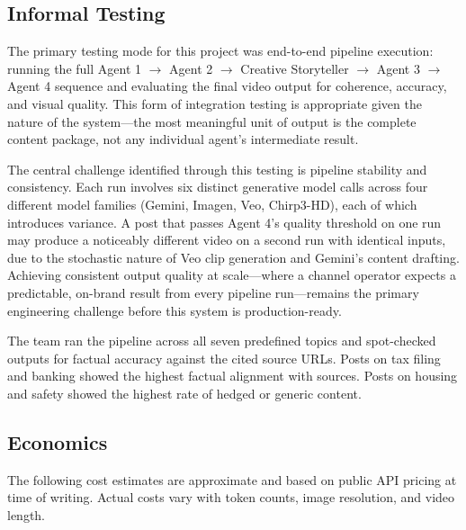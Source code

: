 \documentclass[12pt, letterpaper]{article}
\begin{document}
\subsection{Informal Testing}

The primary testing mode for this project was end-to-end pipeline execution: running the
full Agent 1 $\to$ Agent 2 $\to$ Creative Storyteller $\to$ Agent 3 $\to$ Agent 4 sequence
and evaluating the final video output for coherence, accuracy, and visual quality. This
form of integration testing is appropriate given the nature of the system---the most
meaningful unit of output is the complete content package, not any individual agent's
intermediate result.

The central challenge identified through this testing is pipeline stability and
consistency. Each run involves six distinct generative model calls across four different
model families (Gemini, Imagen, Veo, Chirp3-HD), each of which introduces variance.
A post that passes Agent 4's quality threshold on one run may produce a noticeably
different video on a second run with identical inputs, due to the stochastic nature of
Veo clip generation and Gemini's content drafting. Achieving consistent output quality
at scale---where a channel operator expects a predictable, on-brand result from every
pipeline run---remains the primary engineering challenge before this system is production-ready.

The team ran the pipeline across all seven predefined topics and spot-checked outputs
for factual accuracy against the cited source URLs. Posts on tax filing and banking
showed the highest factual alignment with sources. Posts on housing and safety showed
the highest rate of hedged or generic content.

\subsection{Economics}

The following cost estimates are approximate and based on public API pricing at time of
writing. Actual costs vary with token counts, image resolution, and video length.
\end{document}
